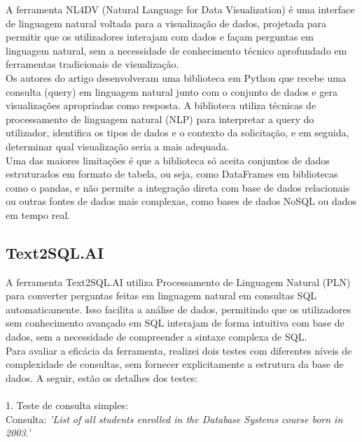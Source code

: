 \documentclass{article}
\begin{document}
\hspace*{1em} A ferramenta NL4DV (Natural Language for Data Visualization) é uma interface de linguagem natural voltada para a visualização de dados, projetada para permitir que os utilizadores interajam com dados e façam perguntas em linguagem natural, sem a necessidade de conhecimento técnico aprofundado em ferramentas tradicionais de visualização.\\
\hspace*{1em} Os autores do artigo desenvolveram uma biblioteca em Python que recebe uma consulta (query) em linguagem natural junto com o conjunto de dados e gera visualizações apropriadas como resposta. A biblioteca utiliza técnicas de processamento de linguagem natural (NLP) para interpretar a query do utilizador, identifica os tipos de dados e o contexto da solicitação, e em seguida, determinar qual visualização seria a mais adequada. \\
\hspace*{1em} Uma das maiores limitações é que a biblioteca só aceita conjuntos de dados estruturados em formato de tabela, ou seja, como DataFrames em bibliotecas como o pandas, e não permite a integração direta com base de dados relacionais ou outras fontes de dados mais complexas, como bases de dados NoSQL ou dados em tempo real.

\subsection{Text2SQL.AI \cite{text2sql}}

\hspace*{1em} A ferramenta Text2SQL.AI utiliza Processamento de Linguagem Natural (PLN) para converter perguntas feitas em linguagem natural em consultas SQL automaticamente. Isso facilita a análise de dados, permitindo que os utilizadores sem conhecimento avançado em SQL interajam de forma intuitiva com base de dados, sem a necessidade de compreender a sintaxe complexa de SQL. \\
\hspace*{1em} Para avaliar a eficácia da ferramenta, realizei dois testes com diferentes níveis de complexidade de consultas, sem fornecer explicitamente a estrutura da base de dados. A seguir, estão os detalhes dos testes:
\\
\\
1. Teste de consulta simples: \\
Consulta: \textit{'List of all students enrolled in the Database Systems course born in 2003.'}
\end{document}
